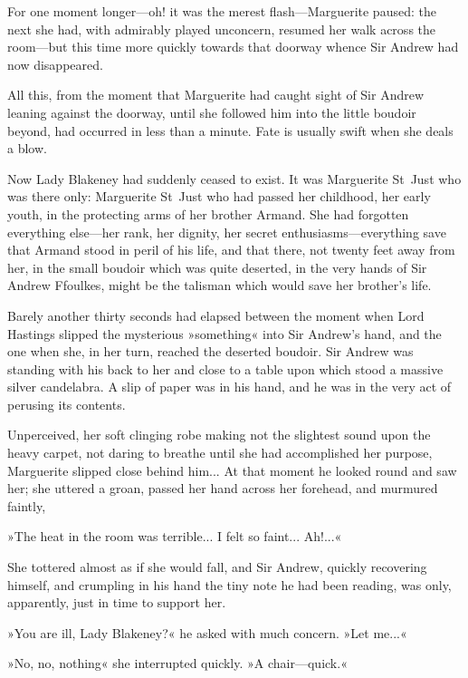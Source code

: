 For one moment longer\allowbreak---\allowbreak oh! it was the merest flash\allowbreak---\allowbreak Marguerite paused: the next she had, with admirably played unconcern, resumed her walk across the room\allowbreak---\allowbreak but this time more quickly towards that doorway whence Sir Andrew had now disappeared.

All this, from the moment that Marguerite had caught sight of Sir Andrew leaning against the doorway, until she followed him into the little boudoir beyond, had occurred in less than a minute. Fate is usually swift when she deals a blow.

Now Lady Blakeney had suddenly ceased to exist. It was Marguerite St~Just who was there only: Marguerite St~Just who had passed her childhood, her early youth, in the protecting arms of her brother Armand. She had forgotten everything else\allowbreak---\allowbreak her rank, her dignity, her secret enthusiasms\allowbreak---\allowbreak everything save that Armand stood in peril of his life, and that there, not twenty feet away from her, in the small boudoir which was quite deserted, in the very hands of Sir Andrew Ffoulkes, might be the talisman which would save her brother's life.

Barely another thirty seconds had elapsed between the moment when Lord Hastings slipped the mysterious »something« into Sir Andrew's hand, and the one when she, in her turn, reached the deserted boudoir. Sir Andrew was standing with his back to her and close to a table upon which stood a massive silver candelabra. A slip of paper was in his hand, and he was in the very act of perusing its contents.

Unperceived, her soft clinging robe making not the slightest sound upon the heavy carpet, not daring to breathe until she had accomplished her purpose, Marguerite slipped close behind him... At that moment he looked round and saw her; she uttered a groan, passed her hand across her forehead, and murmured faintly,\longdash


»The heat in the room was terrible... I felt so faint... Ah!...«

She tottered almost as if she would fall, and Sir Andrew, quickly recovering himself, and crumpling in his hand the tiny note he had been reading, was only, apparently, just in time to support her.

»You are ill, Lady Blakeney?« he asked with much concern. »Let me...«

»No, no, nothing\longdash« she interrupted quickly. »A chair\allowbreak---\allowbreak quick.«

